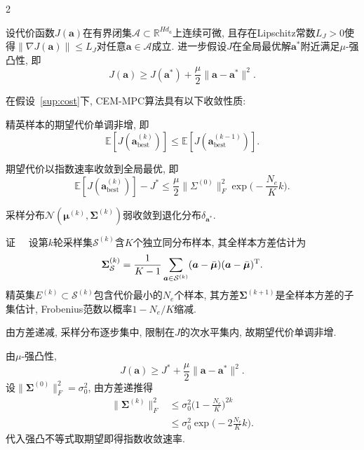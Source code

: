 \begin{multicols}{2}
\begin{Sup}
\label{sup:cost}
设代价函数$J({\bm a})$在有界闭集$\mathcal{A} \subset \mathbb{R}^{Hd_a}$上连续可微,
且存在Lipschitz常数$L_J > 0$使得$\|\nabla J({\bm a})\| \leqslant L_J$对任意${\bm a} \in \mathcal{A}$成立.
进一步假设$J$在全局最优解${\bm a}^*$附近满足$\mu$-强凸性, 即
\begin{equation}
J({\bm a}) \geqslant J({\bm a}^*) + \frac{\mu}{2}\|{\bm a} - {\bm a}^*\|^2.
\end{equation}
\end{Sup}

\begin{Thm}
\label{thm:cem}
在假设~\ref{sup:cost}下, CEM-MPC算法具有以下收敛性质:

精英样本的期望代价单调非增, 即
\begin{equation}
\mathbb{E}[J({\bm a}_{\text{best}}^{(k)})] \leqslant \mathbb{E}[J({\bm a}_{\text{best}}^{(k-1)})].
\end{equation}

期望代价以指数速率收敛到全局最优, 即
\begin{equation}
\mathbb{E}[J({\bm a}_{\text{best}}^{(k)})] - J^*
\leqslant \frac{\mu}{2}\|\Sigma^{(0)}\|_F^2 \exp\big(-\frac{N_e}{K}k\big).
\end{equation}

采样分布$\mathcal{N}({\bm \mu}^{(k)}, {\bm \Sigma}^{(k)})$弱收敛到退化分布$\delta_{{\bm a}^*}$.
\end{Thm}

{证}~~
设第$k$轮采样集$\mathcal{S}^{(k)}$含$K$个独立同分布样本,
其全样本方差估计为
\begin{equation}
{\bm \Sigma}_{\mathcal{S}}^{(k)} = \frac{1}{K-1}\sum_{{\bm a} \in \mathcal{S}^{(k)}}
({\bm a} - \bar{{\bm \mu}})({\bm a} - \bar{{\bm \mu}})^{\rm T}.
\end{equation}
精英集$E^{(k)} \subset \mathcal{S}^{(k)}$包含代价最小的$N_e$个样本,
其方差${\bm \Sigma}^{(k+1)}$是全样本方差的子集估计,
Frobenius范数以概率$1-N_e/K$缩减.

由方差递减, 采样分布逐步集中, 限制在$J$的次水平集内,
故期望代价单调非增.

由$\mu$-强凸性,
\begin{equation}
J({\bm a}) \geqslant J^* + \frac{\mu}{2}\|{\bm a} - {\bm a}^*\|^2.
\end{equation}
设$\|{\bm \Sigma}^{(0)}\|_F^2 = \sigma_0^2$, 由方差递推得
\begin{equation}
\begin{aligned}
\|{\bm \Sigma}^{(k)}\|_F^2 &\leqslant \sigma_0^2 \Big(1 - \frac{N_e}{K}\Big)^{2k} \\
&\leqslant \sigma_0^2 \exp\Big(-2\frac{N_e}{K}k\Big).
\end{aligned}
\end{equation}
代入强凸不等式取期望即得指数收敛速率.


\end{multicols}
